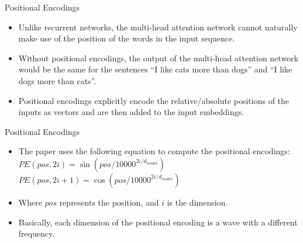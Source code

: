 \documentclass[handout]{beamer}
\begin{document}
\begin{frame}{Positional Encodings}
\begin{scriptsize}
\begin{itemize}

 \item  Unlike recurrent networks, the multi-head attention network cannot naturally make use of the position of the words in the input sequence.
 
 \item Without positional encodings, the output of the multi-head attention network would be the same for the sentences ``I like cats more than dogs'' and ``I like dogs more than cats''.
 
 \item Positional encodings explicitly encode the relative/absolute positions of the inputs as vectors and are then added to the input embeddings.

\end{itemize}

\end{scriptsize}


\end{frame}

\begin{frame}{Positional Encodings}
\begin{scriptsize}
\begin{itemize}

 \item The paper uses the following equation to compute the positional encodings: \\
 $PE(pos,2i) = \sin(pos/10000^{2i/d_{model}})$ 
  $PE(pos,2i+1) = \cos(pos/10000^{2i/d_{model}})$
 
\item Where $pos$ represents the position, and $i$ is the dimension.

\item Basically, each dimension of the positional encoding is a wave with a different frequency. 


\end{itemize}

\end{scriptsize}


\end{frame}
\end{document}

